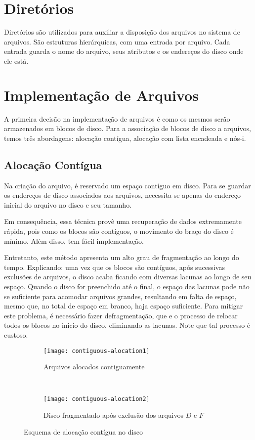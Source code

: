 \section{Diretórios}
Diretórios são utilizados para auxiliar a disposição dos arquivos no sistema de arquivos. São estruturas hierárquicas, com uma entrada por arquivo. Cada entrada guarda o nome do arquivo, seus atributos e os endereços do disco onde ele está.







\section{Implementação de Arquivos}
A primeira decisão na implementação de arquivos é como os mesmos serão armazenados em blocos de disco. Para a associação de blocos de disco a arquivos, temos três abordagens: alocação contígua, alocação com lista encadeada e nós-i.





\subsection{Alocação Contígua}
Na criação do arquivo, é reservado um espaço contíguo em disco. Para se guardar os endereços de disco associados aos arquivos, necessita-se apenas do endereço inicial do arquivo no disco e seu tamanho.

Em consequência, essa técnica provê uma recuperação de dados extremamente rápida, pois como os blocos são contíguos, o movimento do braço do disco é mínimo. Além disso, tem fácil implementação.

Entretanto, este método apresenta um alto grau de fragmentação ao longo do tempo. Explicando: uma vez que os blocos são contíguos, após sucessivas exclusões de arquivos, o disco acaba ficando com diversas lacunas ao longo de seu espaço. Quando o disco for preenchido até o final, o espaço das lacunas pode não se suficiente para acomodar arquivos grandes, resultando em falta de espaço, mesmo que, no total de espaço em branco, haja espaço suficiente. Para mitigar este problema, é necessário fazer defragmentação, que e o processo de relocar todos os blocos no inicio do disco, eliminando as lacunas. Note que tal processo é custoso.

\begin{figure*}[h]
  \begin{subfigure}{\textwidth}
    \centering
    \texttt{[image: contiguous-alocation1]}
    \caption{Arquivos alocados contiguamente}
  \end{subfigure}
  ~
  \begin{subfigure}{\textwidth}
    \centering
    \texttt{[image: contiguous-alocation2]}
    \caption{Disco fragmentado após exclusão dos arquivos $D$ e $F$}
  \end{subfigure}

  \caption{Esquema de alocação contígua no disco}
  \label{fig:contiguous-allocation}
\end{figure*}

